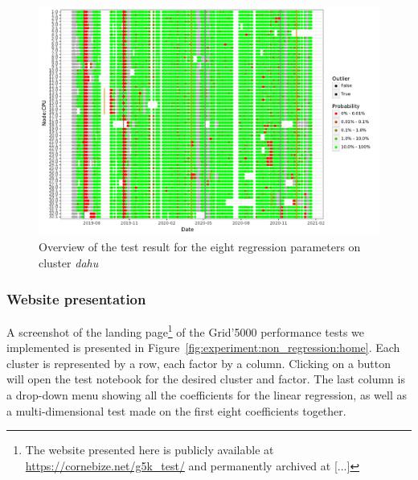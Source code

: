                 \begin{figure}[htpb]
                    \centering
                    \includegraphics[width=\linewidth]{img/experiment/non_regression/implementation/overview_multifactor.pdf}
                    \caption{Overview of the test result for the eight regression parameters on cluster \emph{dahu}}
                    \label{fig:experiment:non_regression:overview_multifactor}
                \end{figure}

            \subsubsection{Website presentation}%

                A screenshot of the landing page\footnote{The website presented here is publicly available at
                \url{https://cornebize.net/g5k_test/} and permanently archived at [...]} of the
                Grid'5000 performance tests we implemented is presented in
                Figure~\ref{fig:experiment:non_regression:home}. Each cluster is represented by a row, each factor by a
                column. Clicking on a button will open the test notebook for the desired cluster and factor. The last
                column is a drop-down menu showing all the coefficients for the linear regression, as well as a
                multi-dimensional test made on the first eight coefficients together.

